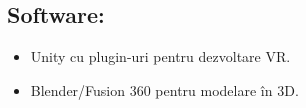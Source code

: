 \documentclass[a4paper,12pt]{report}
\begin{document}
  \subsection{Software:}
  \begin{itemize}
       \item  Unity cu plugin-uri pentru dezvoltare VR.
       \item  Blender/Fusion 360 pentru modelare în 3D.
     
 \end{itemize}






\printbibliography[heading=bibintoc,title=Bibliografie momentană]
\end{document}
